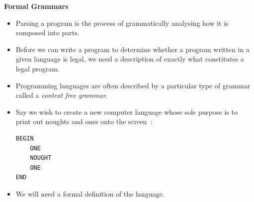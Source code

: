 \newpage
{\samepage
\begin{center}
{\Large{\bf Formal Grammars}}
\end{center}
\begin{itemize}

\item Parsing a program is the process of grammatically analysing how it is composed into parts.

\item Before we can write a program to determine whether a program
written in a given language is legal, we need a description of exactly
what constitutes a legal program.

\item Programming languages are often described by a particular type of
grammar called a {\it context free grammar}.

\item Say we wish to create a new computer language whose sole purpose
is to print out noughts and ones onto the screen~:

\begin{verbatim}
BEGIN
    ONE
    NOUGHT
    ONE
END
\end{verbatim}
\item We will need a formal definition of the language.
\end{itemize}
}

